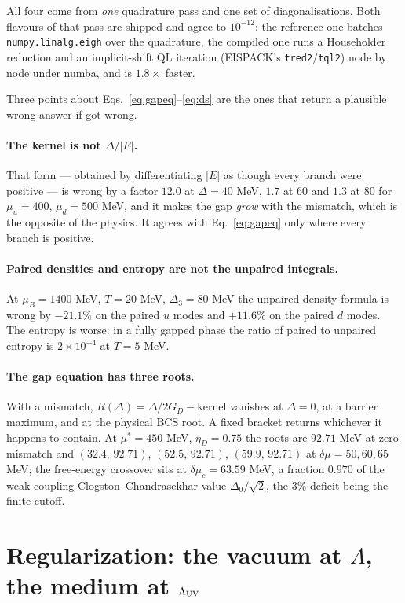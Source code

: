 \documentclass[aps,prc,onecolumn,superscriptaddress,nofootinbib,10pt]{revtex4-2}
\newcommand{\muB}{\mu_B}
\newcommand{\Lam}{\Lambda}
\newcommand{\GD}{G_D}
\begin{document}
All four come from \emph{one} quadrature pass and one set of
diagonalisations. Both flavours of that pass are shipped and agree to
$10^{-12}$: the reference one batches \texttt{numpy.linalg.eigh} over the
quadrature, the compiled one runs a Householder reduction and an
implicit-shift QL iteration (EISPACK's \texttt{tred2}/\texttt{tql2}) node by
node under numba, and is $1.8\times$ faster.

Three points about Eqs.~\eqref{eq:gapeq}--\eqref{eq:ds} are the ones that
return a plausible wrong answer if got wrong.

\paragraph{The kernel is not $\Delta/|E|$.} That form --- obtained by
differentiating $|E|$ as though every branch were positive --- is wrong by a
factor $12.0$ at $\Delta = 40$ MeV, $1.7$ at $60$ and $1.3$ at $80$ for
$\mu_u = 400$, $\mu_d = 500$ MeV, and it makes the gap \emph{grow} with the
mismatch, which is the opposite of the physics. It agrees with
Eq.~\eqref{eq:gapeq} only where every branch is positive.

\paragraph{Paired densities and entropy are not the unpaired integrals.} At
$\muB = 1400$ MeV, $T = 20$ MeV, $\Delta_3 = 80$ MeV the unpaired density
formula is wrong by $-21.1\%$ on the paired $u$ modes and $+11.6\%$ on the
paired $d$ modes. The entropy is worse: in a fully gapped phase the ratio of
paired to unpaired entropy is $2\times10^{-4}$ at $T = 5$ MeV.

\paragraph{The gap equation has three roots.} With a mismatch,
$R(\Delta) = \Delta/2\GD - \mathrm{kernel}$ vanishes at $\Delta = 0$, at a
barrier maximum, and at the physical BCS root. A fixed bracket returns
whichever it happens to contain. At $\mu^{*} = 450$ MeV, $\eta_D = 0.75$ the
roots are $92.71$ MeV at zero mismatch and $(32.4,\,92.71)$, $(52.5,\,92.71)$,
$(59.9,\,92.71)$ at $\delta\mu = 50, 60, 65$ MeV; the free-energy crossover
sits at $\delta\mu_c = 63.59$ MeV, a fraction $0.970$ of the weak-coupling
Clogston--Chandrasekhar value $\Delta_0/\sqrt2$, the $3\%$ deficit being the
finite cutoff.

\section{Regularization: the vacuum at $\Lam$, the medium at $\Lam_{\rm UV}$}
\label{sec:rg}
\end{document}
